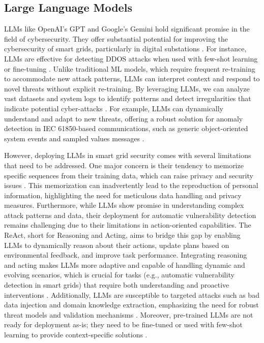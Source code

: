 \documentclass[10pt, journal]{IEEEtran}
\begin{document}
\subsection{Large Language Models}

LLMs like OpenAI's GPT \cite{achiam2023gpt} and Google's Gemini \cite{reid2024gemini} hold significant promise in the field of cybersecurity. They offer substantial potential for improving the cybersecurity of smart grids, particularly in digital substations \cite{zaboli2023chatgpt}. For instance, LLMs are effective for detecting DDOS attacks when used with few-shot learning or fine-tuning \cite{guastalla2023application}. Unlike traditional ML models, which require frequent re-training to accommodate new attack patterns, LLMs can interpret context and respond to novel threats without explicit re-training. By leveraging LLMs, we can analyze vast datasets and system logs to identify patterns and detect irregularities that indicate potential cyber-attacks \cite{gupta2023chatgpt}. For example, LLMs can dynamically understand and adapt to new threats, offering a robust solution for anomaly detection in IEC 61850-based communications, such as generic object-oriented system events and sampled values messages \cite{hussain2023novel}.

However, deploying LLMs in smart grid security comes with several limitations that need to be addressed. One major concern is their tendency to memorize specific sequences from their training data, which can raise privacy and security issues \cite{biderman2024emergent}. This memorization can inadvertently lead to the reproduction of personal information, highlighting the need for meticulous data handling and privacy measures. Furthermore, while LLMs show promise in understanding complex attack patterns and data, their deployment for automatic vulnerability detection remains challenging due to their limitations in action-oriented capabilities. The ReAct, short for Reasoning and Acting, aims to bridge this gap by enabling LLMs to dynamically reason about their actions, update plans based on environmental feedback, and improve task performance. Integrating reasoning and acting makes LLMs more adaptive and capable of handling dynamic and evolving scenarios, which is crucial for tasks (e.g., automatic vulnerability detection in smart grids) that require both understanding and proactive interventions \cite{yao2022react}. Additionally, LLMs are susceptible to targeted attacks such as bad data injection and domain knowledge extraction, emphasizing the need for robust threat models and validation mechanisms \cite{li2024risks}. Moreover, pre-trained LLMs are not ready for deployment as-is; they need to be fine-tuned or used with few-shot learning to provide context-specific solutions \cite{brown2020language}. 
\end{document}
